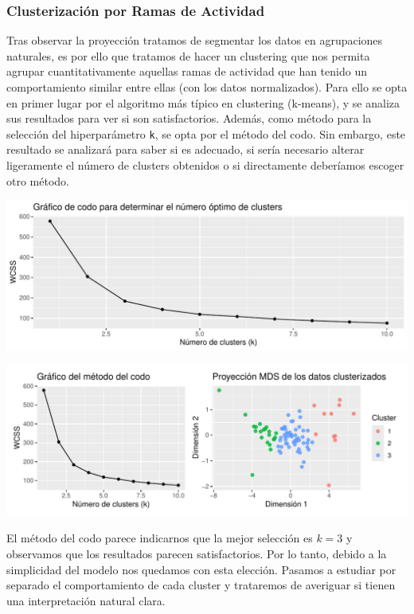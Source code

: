 \documentclass[Universitat de
València,article,submit,moreauthors,pdftex]{Definitions/mdpi}
\begin{document}
\subsubsection{Clusterización por Ramas de
Actividad}\label{clusterizaciuxf3n-por-ramas-de-actividad}

Tras observar la proyección tratamos de segmentar los datos en
agrupaciones naturales, es por ello que tratamos de hacer un clustering
que nos permita agrupar cuantitativamente aquellas ramas de actividad
que han tenido un comportamiento similar entre ellas (con los datos
normalizados). Para ello se opta en primer lugar por el algoritmo más
típico en clustering (k-means), y se analiza sus resultados para ver si
son satisfactorios. Además, como método para la selección del
hiperparámetro \texttt{k}, se opta por el método del codo. Sin embargo,
este resultado se analizará para saber si es adecuado, si sería
necesario alterar ligeramente el número de clusters obtenidos o si
directamente deberíamos escoger otro método.

\includegraphics{ProyectoAED2024_files/figure-latex/unnamed-chunk-45-1.pdf}

\includegraphics{ProyectoAED2024_files/figure-latex/unnamed-chunk-46-1.pdf}

El método del codo parece indicarnos que la mejor selección es \(k=3\) y
observamos que los resultados parecen satisfactorios. Por lo tanto,
debido a la simplicidad del modelo nos quedamos con esta elección.
Pasamos a estudiar por separado el comportamiento de cada cluster y
trataremos de averiguar si tienen una interpretación natural clara.
\end{document}
